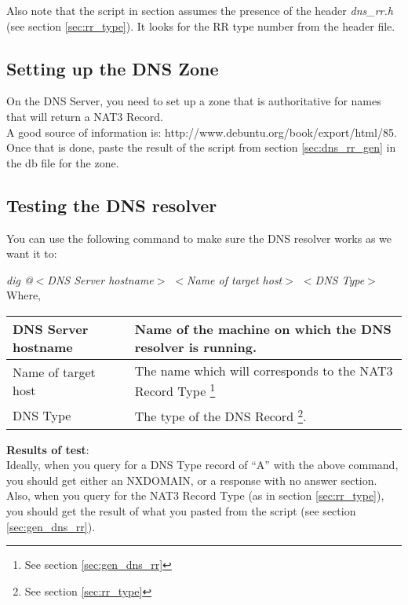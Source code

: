 Also note that the script in section assumes the presence of the header \textit{dns\_rr.h} (see section \ref{sec:rr_type}). It looks for the RR type number from the header file.

\subsection{Setting up the DNS Zone}
On the DNS Server, you need to set up a zone that is authoritative for names that will return a NAT3 Record.\\
A good source of information is: http://www.debuntu.org/book/export/html/85.\\

Once that is done, paste the result of the script from section \ref{sec:dns_rr_gen} in the db file for the zone.

\subsection{Testing the DNS resolver}
\label{sec:dns_test}
You can use the following command to make sure the DNS resolver works as we want it to:

\textit{dig @$<$DNS Server hostname$>$ $<$Name of target host$>$ $<$DNS Type$>$}\\

Where,

\begin{minipage}{\textwidth}
\begin{tabular}{| l | p{4in} |}
            \hline
DNS Server hostname & Name of the machine on which the DNS resolver is running.\\
            \hline
Name of target host & The name which will corresponds to the NAT3 Record Type \footnote{See section \ref{sec:gen_dns_rr}}\\
            \hline
DNS Type            & The type of the DNS Record \footnote{See section \ref{sec:rr_type}}. \\
            \hline
\end{tabular}
\end{minipage}
\newline

\textbf{Results of test}:\\

Ideally, when you query for a DNS Type record of ``A'' with the above command, you should get either an NXDOMAIN, or a response with no answer section. Also, when you query for the NAT3 Record Type (as in section \ref{sec:rr_type}), you should get the result of what you pasted from the script (see section \ref{sec:gen_dns_rr}).

